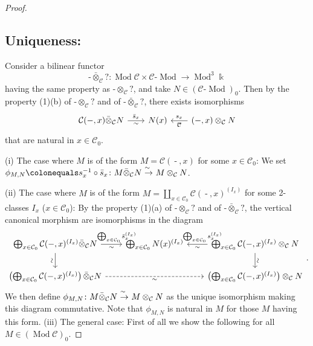 \documentclass{surv-l}
\numberwithin{equation}{chapter}
\numberwithin{figure}{chapter}
\theoremstyle{plain}
\theoremstyle{definition}
\theoremstyle{remark}
\newcommand{\isoto}{\
  \raise.8ex\hbox{$^{\sim}$}\kern-.7em\hbox{$\to$}\ }
\newcommand{\vsim}{\rotatebox{90}{$\sim$}}
\newcommand{\lMod}{\text{-}\!\Mod}
\newcommand{\Ar}[3]{\ar[from={#1}, to={#2}, #3]}
\DeclareMathOperator{\Mod}{Mod}
\DeclareMathOperator{\blank}{-}
\begin{document}
\begin{proof}
\subsection*{Uniqueness:}
Consider a bilinear functor
\[
\blank \bar{\otimes}_{\mathcal{C}} ?  \colon \Mod {\mathcal{C}} \times {\mathcal{C}}\lMod \to \Mod^3 \Bbbk
\]
having the same property as $\blank \otimes_{\mathcal{C}} ?$,
and take $N \in ({\mathcal{C}}\lMod)_0$.
Then by the property (1)(b) of $\blank \otimes_{\mathcal{C}} ?$ and of $\blank \bar{\otimes}_{\mathcal{C}} ?$,
there exists isomorphisms
\[
\begin{tikzcd}[row sep=4em, column sep=2em]
{\mathcal{C}}(\blank, x) \bar{\otimes}_{\mathcal{C}} N  \rar["\bar{s}_x", "\sim" '] & N(x) &\lar["s_x" ', "\sim"]
{\mathcal{C}}(\blank, x) \otimes_{\mathcal{C}} N
\end{tikzcd}
\]
that are natural in $x \in {\mathcal{C}}_0$.

(i) The case where $M$ is of the form $M = {\mathcal{C}}(\blank, x)$
for some $x \in {\mathcal{C}}_0$:
We set
$\phi_{M, N}\colonequals  s_x^{-1} \circ \bar{s}_x \colon M \bar\otimes_{\mathcal{C}} N \isoto M \otimes_{\mathcal{C}} N$.

(ii) The case where $M$ is of the form
$M = \coprod_{x \in {\mathcal{C}}_0} {\mathcal{C}}(\blank, x)^{(I_x)}$ for some 2-classes
$I_x$ ($x\in {\mathcal{C}}_0$):
By the property (1)(a) of
$\blank \otimes_{\mathcal{C}} ?$ and of $\blank \bar{\otimes}_{\mathcal{C}} ?$,
the vertical canonical morphism are isomorphisms
in the diagram
{\small\begin{equation*}
\begin{tikzcd}[column sep=2em]
 \bigoplus_{x \in {\mathcal{C}}_0}{\mathcal{C}}(\blank, x)^{(I_x)} \bar{\otimes}_{\mathcal{C}} N \rar["\bigoplus_{x \in {\mathcal{C}}_0}\bar{s}_x^{(I_x)}" near end, "\sim" ']&  \bigoplus_{x \in {\mathcal{C}}_0} N(x)^{(I_x)} &\lar["\bigoplus_{x \in {\mathcal{C}}_0}s_x^{(I_x)}" ' near start, "\sim"]
 \bigoplus_{x \in {\mathcal{C}}_0}{\mathcal{C}}(\blank, x)^{(I_x)} \otimes_{\mathcal{C}} N\\
\left(\bigoplus_{x \in {\mathcal{C}}_0} {\mathcal{C}}(\blank, x)^{(I_x)}\right) \bar{\otimes}_{\mathcal{C}}  N & &  \left(\bigoplus_{x \in {\mathcal{C}}_0}{\mathcal{C}}(\blank, x)^{(I_x)}\right) \otimes_{\mathcal{C}} N
\Ar{1-1}{2-1}{"\vsim" '}
\Ar{1-3}{2-3}{"\vsim"}
\Ar{2-1}{2-3}{"\sim" ', dashed}
\end{tikzcd}.
\end{equation*}}%
We then define $\phi_{M,N}\colon M \bar\otimes_{\mathcal{C}} N \isoto M \otimes_{\mathcal{C}} N$
as the unique isomorphism making this diagram commutative.
Note that $\phi_{M,N}$ is natural in $M$ for those $M$ having this form.
(iii) The general case:
First of all we show the following for all $M \in (\Mod{\mathcal{C}})_0$.


\end{proof}
\end{document}
